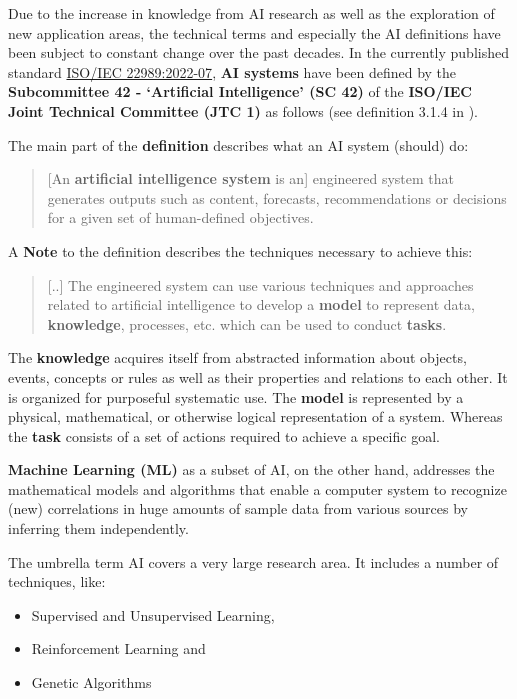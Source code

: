 \documentclass [oneside,10pt,a4paper,ngerman,BCOR10mm,headsepline,parindent,final]{scrartcl}
\providecommand{\tightlist}{%
      \setlength{\itemsep}{0pt}\setlength{\parskip}{0pt}}
\begin{document}
Due to the increase in knowledge from AI research as well as the
exploration of new application areas, the technical terms and especially
the AI definitions have been subject to constant change over the past
decades. In the currently published standard
\href{https://webstore.iec.ch/publication/77839}{ISO/IEC 22989:2022-07},
\textbf{AI systems} have been defined by the \textbf{Subcommittee 42 -
`Artificial Intelligence' (SC 42)} of the \textbf{ISO/IEC Joint
Technical Committee (JTC 1)} as follows (see definition 3.1.4 in
\cite{ISO_IEC_22989_2022-07}).

The main part of the \textbf{definition} describes what an AI system
(should) do:

\begin{quote}
{[}An \textbf{artificial intelligence system} is an{]} engineered system
that generates outputs such as content, forecasts, recommendations or
decisions for a given set of human-defined objectives.
\end{quote}

A \textbf{Note} to the definition describes the techniques necessary to
achieve this:

\begin{quote}
{[}..{]} The engineered system can use various techniques and approaches
related to artificial intelligence to develop a \textbf{model} to
represent data, \textbf{knowledge}, processes, etc. which can be used to
conduct \textbf{tasks}.
\end{quote}

The \textbf{knowledge} acquires itself from abstracted information about
objects, events, concepts or rules as well as their properties and
relations to each other. It is organized for purposeful systematic use.
The \textbf{model} is represented by a physical, mathematical, or
otherwise logical representation of a system. Whereas the \textbf{task}
consists of a set of actions required to achieve a specific goal.

\textbf{Machine Learning (ML)} as a subset of AI, on the other hand,
addresses the mathematical models and algorithms that enable a computer
system to recognize (new) correlations in huge amounts of sample data
from various sources by inferring them independently.

The umbrella term AI covers a very large research area. It includes a
number of techniques, like:

\begin{itemize}
\tightlist
\item
  Supervised and Unsupervised Learning,
\item
  Reinforcement Learning and
\item
  Genetic Algorithms
\end{itemize}
\end{document}
